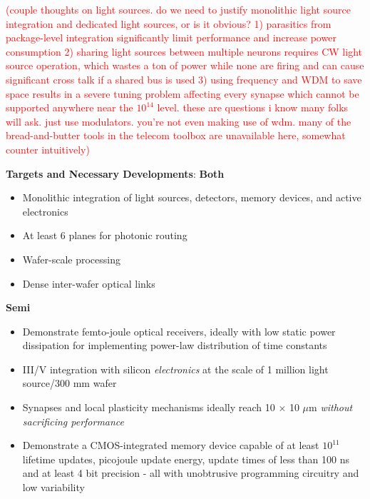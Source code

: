 \documentclass[twocolumn]{article}
\begin{document}
\textcolor{red}{(couple thoughts on light sources. do we need to justify monolithic light source integration and dedicated light sources, or is it obvious? 1) parasitics from package-level integration significantly limit performance and increase power consumption 2) sharing light sources between multiple neurons requires CW light source operation, which wastes a ton of power while none are firing and can cause significant cross talk if a shared bus is used 3) using frequency and WDM to save space results in a severe tuning problem affecting every synapse which cannot be supported anywhere near the $10^{14}$ level. these are questions i know many folks will ask. just use modulators. you're not even making use of wdm. many of the bread-and-butter tools in the telecom toolbox are unavailable here, somewhat counter intuitively)}

\textbf{Targets and Necessary Developments}:
\newline
\newline
\textbf{Both}
\begin{itemize}
    \item Monolithic integration of light sources, detectors, memory devices, and active electronics
    \item At least 6 planes for photonic routing
    \item Wafer-scale processing
    \item Dense inter-wafer optical links

\end{itemize}

\textbf{Semi}
\begin{itemize}
    \item Demonstrate femto-joule optical receivers, ideally with low static power dissipation for implementing power-law distribution of time constants
    \item III/V integration with silicon \textit{electronics} at the scale of 1 million light source/300 mm wafer
    \item Synapses and local plasticity mechanisms ideally reach 10 $\times$ 10 $\mu$m \textit{without sacrificing performance}
    \item Demonstrate a CMOS-integrated memory device capable of at least $10^{11}$ lifetime updates, picojoule update energy, update times of less than 100 ns and at least 4 bit precision - all with unobtrusive programming circuitry and low variability
\end{itemize}
\end{document}
